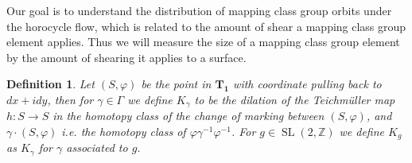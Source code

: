 \documentclass{article}
\newtheorem{defn}{Definition}
\newcommand{\slz}{\operatorname{SL}(2,\mathbb{Z})}
\begin{document}
        Our goal is to understand the distribution of mapping class group orbits under the horocycle flow, which is related to the amount of shear a mapping class group element applies. Thus we will measure the size of a mapping class group element by the amount of shearing it applies to a surface.
        \begin{defn}
            Let \((S, \varphi)\) be the point in \(\mathbf{T_1}\) with coordinate pulling back to \(dx + idy\), then for \(\gamma \in \Gamma\) we define \(K_{\gamma}\) to be the dilation of the Teichm\"uller map \(h: S \to S\) in the homotopy class of the change of marking between \((S,\varphi)\), and \(\gamma\cdot(S,\varphi)\) i.e. the homotopy class of \(\varphi \gamma^{-1} \varphi^{-1}\). For \(g \in \slz\) we define \(K_g\) as \(K_\gamma\) for \(\gamma\) associated to \(g\).
        \end{defn}
\end{document}
